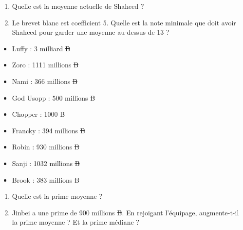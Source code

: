 \begin{enumerate}
    \item Quelle est la moyenne actuelle de Shaheed ?
    \item Le brevet blanc est coefficient 5. Quelle est la note minimale que doit avoir Shaheed pour garder une moyenne au-dessus de 13 ?
\end{enumerate}


\begin{multicols}{3}
    \begin{itemize}
        \item Luffy : 3 milliard \sout{B}
        \item Zoro : 1111 millions \sout{B}
        \item Nami : 366 millions \sout{B}
        \item God Usopp : 500 millions \sout{B}
        \item Chopper : 1000 \sout{B}
        \item Francky : 394 millions \sout{B}
        \item Robin : 930 millions \sout{B}
        \item Sanji : 1032 millions \sout{B}
        \item Brook : 383 millions \sout{B}
    \end{itemize}
\end{multicols}

\begin{enumerate}
    \item Quelle est la prime moyenne ?
    \item Jinbei a une prime de 900 millions \sout{B}. En rejoigant l'équipage, augmente-t-il la prime moyenne ? Et la prime médiane ?
\end{enumerate}